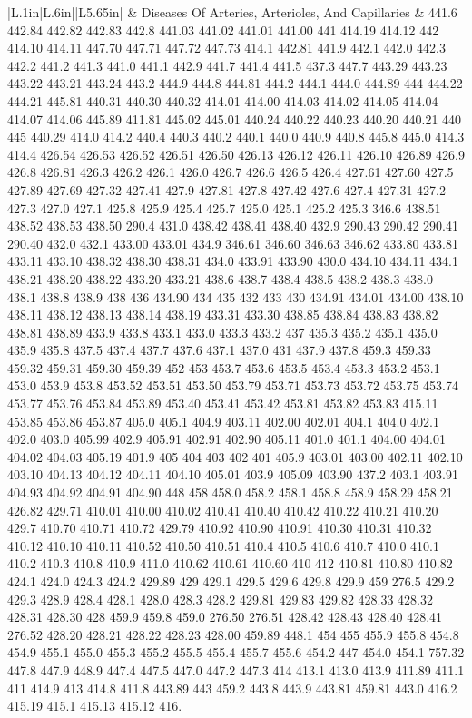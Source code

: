 \begin{longtable}{|L{.1in}|L{.6in}||L{5.65in}|}
   & Diseases Of Arteries, Arterioles, And Capillaries  &  441.6 442.84 442.82 442.83 442.8 441.03 441.02 441.01 441.00 441 414.19 414.12 442 414.10 414.11 447.70 447.71 447.72 447.73 414.1 442.81 441.9 442.1 442.0 442.3 442.2 441.2 441.3 441.0 441.1 442.9 441.7 441.4 441.5 437.3 447.7 443.29 443.23 443.22 443.21 443.24 443.2 444.9 444.8 444.81 444.2 444.1 444.0 444.89 444 444.22 444.21 445.81 440.31 440.30 440.32 414.01 414.00 414.03 414.02 414.05 414.04 414.07 414.06 445.89 411.81 445.02 445.01 440.24 440.22 440.23 440.20 440.21 440 445 440.29 414.0 414.2 440.4 440.3 440.2 440.1 440.0 440.9 440.8 445.8 445.0 414.3 414.4 426.54 426.53 426.52 426.51 426.50 426.13 426.12 426.11 426.10 426.89 426.9 426.8 426.81 426.3 426.2 426.1 426.0 426.7 426.6 426.5 426.4 427.61 427.60 427.5 427.89 427.69 427.32 427.41 427.9 427.81 427.8 427.42 427.6 427.4 427.31 427.2 427.3 427.0 427.1 425.8 425.9 425.4 425.7 425.0 425.1 425.2 425.3 346.6 438.51 438.52 438.53 438.50 290.4 431.0 438.42 438.41 438.40 432.9 290.43 290.42 290.41 290.40 432.0 432.1 433.00 433.01 434.9 346.61 346.60 346.63 346.62 433.80 433.81 433.11 433.10 438.32 438.30 438.31 434.0 433.91 433.90 430.0 434.10 434.11 434.1 438.21 438.20 438.22 433.20 433.21 438.6 438.7 438.4 438.5 438.2 438.3 438.0 438.1 438.8 438.9 438 436 434.90 434 435 432 433 430 434.91 434.01 434.00 438.10 438.11 438.12 438.13 438.14 438.19 433.31 433.30 438.85 438.84 438.83 438.82 438.81 438.89 433.9 433.8 433.1 433.0 433.3 433.2 437 435.3 435.2 435.1 435.0 435.9 435.8 437.5 437.4 437.7 437.6 437.1 437.0 431 437.9 437.8 459.3 459.33 459.32 459.31 459.30 459.39 452 453 453.7 453.6 453.5 453.4 453.3 453.2 453.1 453.0 453.9 453.8 453.52 453.51 453.50 453.79 453.71 453.73 453.72 453.75 453.74 453.77 453.76 453.84 453.89 453.40 453.41 453.42 453.81 453.82 453.83 415.11 453.85 453.86 453.87 405.0 405.1 404.9 403.11 402.00 402.01 404.1 404.0 402.1 402.0 403.0 405.99 402.9 405.91 402.91 402.90 405.11 401.0 401.1 404.00 404.01 404.02 404.03 405.19 401.9 405 404 403 402 401 405.9 403.01 403.00 402.11 402.10 403.10 404.13 404.12 404.11 404.10 405.01 403.9 405.09 403.90 437.2 403.1 403.91 404.93 404.92 404.91 404.90 448 458 458.0 458.2 458.1 458.8 458.9 458.29 458.21 426.82 429.71 410.01 410.00 410.02 410.41 410.40 410.42 410.22 410.21 410.20 429.7 410.70 410.71 410.72 429.79 410.92 410.90 410.91 410.30 410.31 410.32 410.12 410.10 410.11 410.52 410.50 410.51 410.4 410.5 410.6 410.7 410.0 410.1 410.2 410.3 410.8 410.9 411.0 410.62 410.61 410.60 410 412 410.81 410.80 410.82 424.1 424.0 424.3 424.2 429.89 429 429.1 429.5 429.6 429.8 429.9 459 276.5 429.2 429.3 428.9 428.4 428.1 428.0 428.3 428.2 429.81 429.83 429.82 428.33 428.32 428.31 428.30 428 459.9 459.8 459.0 276.50 276.51 428.42 428.43 428.40 428.41 276.52 428.20 428.21 428.22 428.23 428.00 459.89 448.1 454 455 455.9 455.8 454.8 454.9 455.1 455.0 455.3 455.2 455.5 455.4 455.7 455.6 454.2 447 454.0 454.1 757.32 447.8 447.9 448.9 447.4 447.5 447.0 447.2 447.3 414 413.1 413.0 413.9 411.89 411.1 411 414.9 413 414.8 411.8 443.89 443 459.2 443.8 443.9 443.81 459.81 443.0 416.2 415.19 415.1 415.13 415.12 416.\\\hline

\end{longtable}
